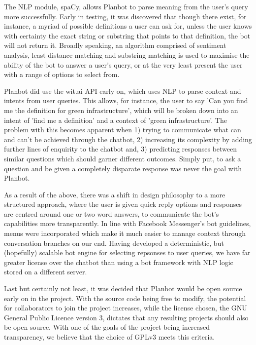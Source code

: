 \documentclass[12pt, a4paper]{article}
\begin{document}
  The NLP module, spaCy, allows Planbot to parse meaning from the user's query
  more successfully. Early in testing, it was discovered that though there
  exist, for instance, a myriad of possible definitions a user can ask for,
  unless the user knows with certainty the exact string or substring that
  points to that definition, the bot will not return it. Broadly speaking, an
  algorithm comprised of sentiment analysis, least distance matching and
  substring matching is used to maximise the ability of the bot to answer a
  user's query, or at the very least present the user with a range of options
  to select from.

  Planbot did use the wit.ai API early on, which uses NLP to parse context and
  intents from user queries. This allows, for instance, the user to say 'Can
  you find me the definition for green infrastructure', which will be broken
  down into an intent of 'find me a definition' and a context of 'green
  infrastructure'. The problem with this becomes apparent when 1) trying to
  communicate what can and can't be achieved through the chatbot, 2)
  increasing its complexity by adding further lines of enquirity to the chatbot
  and, 3) predicting responses between similar questions which should garner
  different outcomes. Simply put, to ask a question and be given a completely
  disparate response was never the goal with Planbot.

  As a result of the above, there was a shift in design philosophy to a more
  structured approach, where the user is given quick reply options and
  responses are centred around one or two word answers, to communicate the
  bot's capabilities more transparently. In line with Facebook Messenger's bot
  guidelines, menus were incorporated which make it much easier to manage
  context through conversation branches on our end. Having developed a
  deterministic, but (hopefully) scalable bot engine for selecting repsonses
  to user queries, we have far greater license over the chatbot than using a
  bot framework with NLP logic stored on a different server.

  Last but certainly not least, it was decided that Planbot would be open
  source early on in the project. With the source code being free to modify,
  the potential for collaborators to join the project increases, while the
  license chosen, the GNU General Public Licence version 3, dictates that any
  resulting projects should also be open source. With one of the goals of the
  project being increased transparency, we believe that the choice of GPLv3
  meets this criteria.
\end{document}
